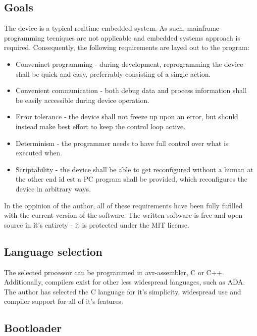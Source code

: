 \subsection{Goals}
The device is a typical realtime embedded system.
As such, mainframe programming tecniques are not applicable and embedded systems approach is required.
Consequently, the following requirements are layed out to the program:
\begin{itemize}
\item{Conveninet programming - during development, reprogramming the device shall be quick and easy, preferrably consisting of a single action.}
\item{Convenient communication - both debug data and process information shall be easily accessible during device operation.}
\item{Error tolerance - the device shall not freeze up upon an error, but should instead make best effort to keep the control loop active.}
\item{Determinism - the programmer needs to have full control over what is executed when.}
\item{Scriptability - the device shall be able to get reconfigured without a human at the other end id est a PC program shall be provided, which reconfigures the device in arbitrary ways.}
\end{itemize}
In the oppinion of the author, all of these requirements have been fully fufilled with the current version of the software.
The written software is free and open-source in it's entirety - it is protected under the MIT license.

\subsection{Language selection}
The selected processor can be programmed in avr-assembler, C or C++.
Additionally, compilers exist for other less widespread languages, such as ADA.
The author has selected the C language for it's simplicity, widespread use and compiler support for all of it's features.

\subsection{Bootloader}
